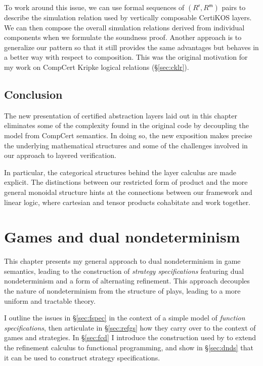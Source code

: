 \documentclass[11pt,oneside]{book}
\theoremstyle{definition}
\newcommand{\kw}[1]{\ensuremath{ \mathsf{#1} }}
\begin{document}
To work around this issue,
we can use formal sequences of
$(R^\kw{r}, R^\kw{m})$ pairs to describe the
simulation relation used by vertically composable
CertiKOS layers.
We can then compose 
the overall simulation relations derived from
individual components
when we formulate the soundness proof.
Another approach is to generalize our pattern
so that it still provides the same advantages
but behaves in a better way
with respect to composition.
This was the original motivation
for my work on
CompCert Kripke logical relations
(\S\ref{sec:cklr}).



\section{Conclusion} %

The new presentation of certified abstraction layers
laid out in this chapter
eliminates some of the complexity found in the original code
by decoupling the model from CompCert semantics.
In doing so,
the new exposition makes precise the underlying mathematical structures
and some of the challenges involved in
our approach to layered verification.

In particular,
the categorical structures behind the layer calculus
are made explicit.
The distinctions between our restricted form of product
and the more general monoidal structure
hints at the connections between our framework
and linear logic,
where cartesian and tensor products cohabitate
and work together.




\chapter{Games and dual nondeterminism} \label{sec:games-dnd} %

This chapter presents my general approach
to dual nondeterminism in game semantics,
leading to the construction of \emph{strategy specifications}
featuring dual nondeterminism and a form of alternating refinement.
This approach decouples the nature of nondeterminism
from the structure of plays,
leading to a more uniform and tractable theory.

I outline the issues in \S\ref{sec:fspec}
in the context of a simple model of \emph{function specifications},
then articulate in \S\ref{sec:refgs}
how they carry over to the context of games and strategies.
In \S\ref{sec:fcd} I introduce the construction used by \citet{augtyp}
to extend the refinement calculus to functional programming,
and show in \S\ref{sec:dnds} that it can be used
to construct strategy specifications.
\end{document}
